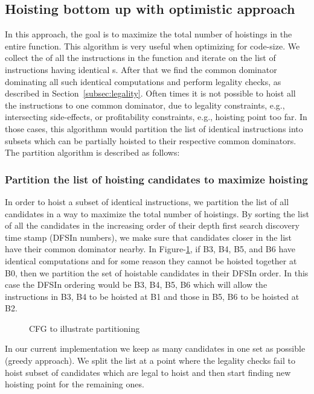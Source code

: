 \documentclass{sig-alternate}
\begin{document}
\subsection{Hoisting bottom up with optimistic approach}
\label{subsec:optimistic}
In this approach, the goal is to maximize the total number of hoistings in the
entire function.  This algorithm is very useful when optimizing for code-size.
We collect the \GVN{} of all the instructions in the function and iterate on the
list of instructions having identical \GVN{}s. After that we find the common
dominator dominating all such identical computations and perform legality
checks, as described in Section~\ref{subsec:legality}. Often times it is not
possible to hoist all the instructions to one common dominator, due to legality
constraints, e.g., intersecting side-effects, or profitability constraints, e.g.,
hoisting point too far. In those cases, this algorithmn would partition the list
of identical instructions into subsets which can be partially hoisted to their
respective common dominators. The partition algorithm is described as follows:

\subsubsection{Partition the list of hoisting candidates to maximize hoisting}
\label{subsec:partition}
In order to hoist a subset of identical instructions, we partition the list of
all candidates in a way to maximize the total number of hoistings.  By sorting
the list of all the candidates in the increasing order of their depth first
search discovery time stamp \cite{clrs} (DFSIn numbers), we make sure that
candidates closer in the list have their common dominator nearby. In
Figure-\ref{fig:dfsin}, if B3, B4, B5, and B6 have identical computations and for
some reason they cannot be hoisted together at B0, then we partition the set of
hoistable candidates in their DFSIn order. In this case the DFSIn ordering would
be B3, B4, B5, B6 which will allow the instructions in B3, B4 to be hoisted at
B1 and those in B5, B6 to be hoisted at B2.

\begin{figure}
\centering
\caption{CFG to illustrate partitioning}
\label{fig:dfsin}
\end{figure}

In our current implementation we keep as many candidates in one set as possible
(greedy approach). We split the list at a point where the legality checks fail
to hoist subset of candidates which are legal to hoist and then start finding
new hoisting point for the remaining ones.
\end{document}
